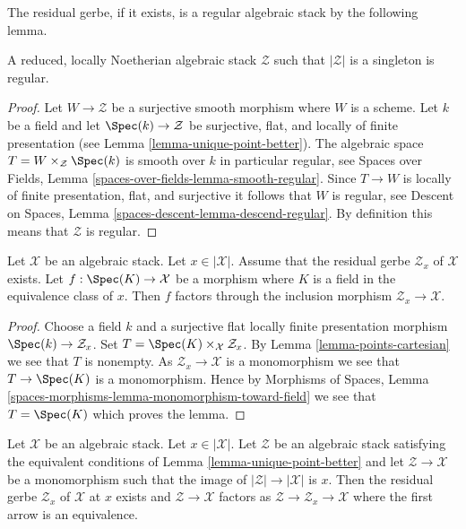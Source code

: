 \noindent
The residual gerbe, if it exists, is a regular algebraic stack
by the following lemma.

\begin{lemma}
\label{lemma-residual-gerbe-regular}
A reduced, locally Noetherian algebraic stack $\mathcal{Z}$ such that
$|\mathcal{Z}|$ is a singleton is regular.
\end{lemma}

\begin{proof}
Let $W \to \mathcal{Z}$ be a surjective smooth morphism where $W$ is a scheme.
Let $k$ be a field and let $\Spec(k) \to \mathcal{Z}$ be surjective,
flat, and locally of finite presentation (see
Lemma \ref{lemma-unique-point-better}).
The algebraic space $T = W \times_\mathcal{Z} \Spec(k)$ is
smooth over $k$ in particular regular, see
Spaces over Fields, Lemma \ref{spaces-over-fields-lemma-smooth-regular}.
Since $T \to W$ is locally of finite presentation, flat, and surjective it
follows that $W$ is regular, see
Descent on Spaces, Lemma \ref{spaces-descent-lemma-descend-regular}.
By definition this means that $\mathcal{Z}$ is regular.
\end{proof}

\begin{lemma}
\label{lemma-residual-gerbe-points}
Let $\mathcal{X}$ be an algebraic stack. Let $x \in |\mathcal{X}|$.
Assume that the residual gerbe $\mathcal{Z}_x$ of $\mathcal{X}$ exists.
Let $f : \Spec(K) \to \mathcal{X}$ be a morphism where $K$ is a field
in the equivalence class of $x$. Then $f$ factors through the inclusion
morphism $\mathcal{Z}_x \to \mathcal{X}$.
\end{lemma}

\begin{proof}
Choose a field $k$ and a surjective flat locally finite presentation
morphism $\Spec(k) \to \mathcal{Z}_x$. Set
$T = \Spec(K) \times_\mathcal{X} \mathcal{Z}_x$. By
Lemma \ref{lemma-points-cartesian}
we see that $T$ is nonempty. As $\mathcal{Z}_x \to \mathcal{X}$
is a monomorphism we see that $T \to \Spec(K)$ is a monomorphism.
Hence by
Morphisms of Spaces, Lemma
\ref{spaces-morphisms-lemma-monomorphism-toward-field}
we see that $T = \Spec(K)$ which proves the lemma.
\end{proof}

\begin{lemma}
\label{lemma-residual-gerbe-unique}
Let $\mathcal{X}$ be an algebraic stack. Let $x \in |\mathcal{X}|$.
Let $\mathcal{Z}$ be an algebraic stack satisfying the equivalent conditions of
Lemma \ref{lemma-unique-point-better}
and let $\mathcal{Z} \to \mathcal{X}$ be a monomorphism such that the image
of $|\mathcal{Z}| \to |\mathcal{X}|$ is $x$. Then the residual gerbe
$\mathcal{Z}_x$ of $\mathcal{X}$ at $x$ exists and
$\mathcal{Z} \to \mathcal{X}$ factors as
$\mathcal{Z} \to \mathcal{Z}_x \to \mathcal{X}$ where the first arrow
is an equivalence.
\end{lemma}

